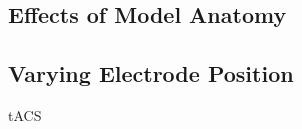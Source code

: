 \subsection{Effects of Model Anatomy}
\subsection{Varying Electrode Position}
\gls{tACS}
\cite{ITstissue}
\cite{Lee2016}
\cite{Lee2018}
\cite{ErikG.Lee2016}
\cite{Hsu2019}
\cite{Rampersad2019}
